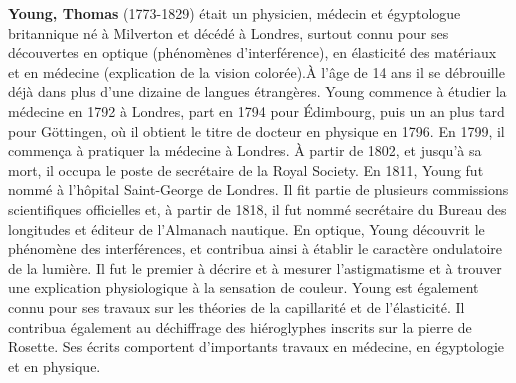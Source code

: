 \textbf{Young, Thomas} (1773-1829) était un physicien, médecin et égyptologue britannique né à Milverton et décédé à Londres, surtout connu pour ses découvertes en optique (phénomènes d'interférence), en élasticité des matériaux et en médecine (explication de la vision colorée).À l'âge de 14 ans il se débrouille déjà dans plus d'une dizaine de langues étrangères. Young commence à étudier la médecine en 1792 à Londres, part en 1794 pour Édimbourg, puis un an plus tard pour Göttingen, où il obtient le titre de docteur en physique en 1796. En 1799, il commença à pratiquer la médecine à Londres. À partir de 1802, et jusqu'à sa mort, il occupa le poste de secrétaire de la Royal Society. En 1811, Young fut nommé à l'hôpital Saint-George de Londres. Il fit partie de plusieurs commissions scientifiques officielles et, à partir de 1818, il fut nommé secrétaire du Bureau des longitudes et éditeur de l'Almanach nautique. En optique, Young découvrit le phénomène des interférences, et contribua ainsi à établir le caractère ondulatoire de la lumière. Il fut le premier à décrire et à mesurer l'astigmatisme et à trouver une explication physiologique à la sensation de couleur. Young est également connu pour ses travaux sur les théories de la capillarité et de l'élasticité. Il contribua également au déchiffrage des hiéroglyphes inscrits sur la pierre de Rosette. Ses écrits comportent d'importants travaux en médecine, en égyptologie et en physique.

{}
\label{sec:Z}

